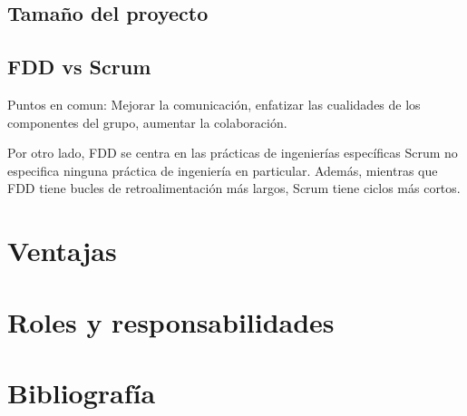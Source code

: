 \documentclass[11pt]{article}
\begin{document}
\subsection*{Tamaño del proyecto}


\subsection*{FDD vs Scrum}
Puntos en comun: Mejorar la comunicación, enfatizar las cualidades de los componentes del grupo, aumentar la colaboración.

Por otro lado, FDD se centra en las prácticas de ingenierías específicas Scrum no especifica ninguna práctica de ingeniería en particular. Además, mientras que FDD tiene bucles de retroalimentación más largos, Scrum tiene ciclos más cortos.

\section{Ventajas}

\section{Roles y responsabilidades}

\newpage
\section{Bibliografía}
%
%
\end{document}
